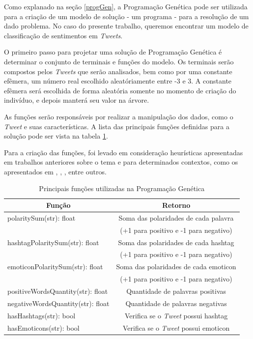 \documentclass[12pt]{article}
\begin{document}
Como explanado na seção \ref{progGen}, a Programação Genética pode ser utilizada para a criação de um modelo de solução - um programa - para a resolução de um dado problema. No caso do presente trabalho, queremos encontrar um modelo de classificação de sentimentos em \emph{Tweets}.

O primeiro passo para projetar uma solução de Programação Genética é determinar o conjunto de terminais e funções do modelo. Os terminais serão compostos pelos \emph{Tweets} que serão analisados, bem como por uma constante efêmera, um número real escolhido aleatóriamente entre -3 e 3. A constante efêmera será escolhida de forma aleatória somente no momento de criação do indivíduo, e depois manterá seu valor na árvore.

As funções serão responsáveis por realizar a manipulação dos dados, como o \emph{Tweet} e suas características. A lista das principais funções definidas para a solução pode ser vista na tabela \ref{tab_functions}.


Para a criação das funções, foi levado em consideração heurísticas apresentadas em trabalhos anteriores sobre o tema e para determinados contextos, como os apresentados em \cite{araujo2013metodos}, \cite{Rodrigues2016}, \cite{Turney2002}, entre outros.

\begin{table}[H]
	\centering
	\begin{tabular}{lc}
	\multicolumn{1}{c}{\textbf{Função}} & \multicolumn{1}{c}{\textbf{Retorno}} \\
	\hline
	polaritySum(str): float & Soma das polaridades de cada palavra \\& (+1 para positivo e -1 para negativo) \\
	\hline
	hashtagPolaritySum(str): float & Soma das polaridades de cada hashtag \\& (+1 para positivo e -1 para negativo) \\
	\hline
	emoticonPolaritySum(str): float & Soma das polaridades de cada emoticon \\& (+1 para positivo e -1 para negativo) \\
	\hline
	positiveWordsQuantity(str): float & Quantidade de palavras positivas \\
	\hline
	negativeWordsQuantity(str): float & Quantidade de palavras negativas \\
	\hline
	hasHashtags(str): bool & Verifica se o \emph{Tweet} possui hashtag \\
	\hline
	hasEmoticons(str): bool & Verifica se o \emph{Tweet} possui emoticon \\
	\hline
	\end{tabular}
	\caption{Principais funções utilizadas na Programação Genética}
	\label{tab_functions}
\end{table}
\end{document}
